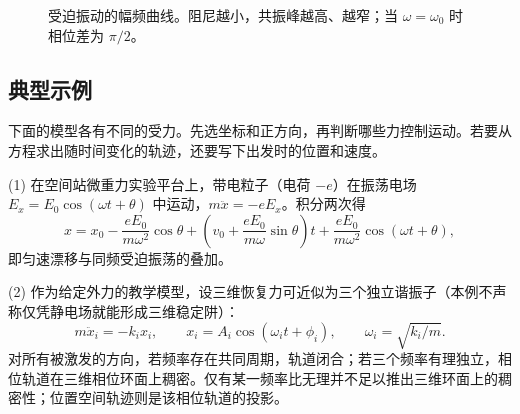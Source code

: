\begin{figure}[htbp]
\centering
{}
\caption{受迫振动的幅频曲线。阻尼越小，共振峰越高、越窄；当 $\omega=\omega_0$ 时相位差为 $\pi/2$。}
\label{fig:resonance}
\end{figure}

\subsection{典型示例}

下面的模型各有不同的受力。先选坐标和正方向，再判断哪些力控制运动。若要从方程求出随时间变化的轨迹，还要写下出发时的位置和速度。

\begin{example}[空间站微重力实验中的受迫振动与三维谐振子]
(1) 在空间站微重力实验平台上，带电粒子（电荷 $-e$）在振荡电场 $E_x=E_0\cos(\omega t+\theta)$ 中运动，$m\ddot x=-eE_x$。积分两次得
\[
x=x_0-\frac{eE_0}{m\omega^2}\cos\theta
+\left(v_0+\frac{eE_0}{m\omega}\sin\theta\right)t
+\frac{eE_0}{m\omega^2}\cos(\omega t+\theta),
\]
即匀速漂移与同频受迫振荡的叠加。

(2) 作为给定外力的教学模型，设三维恢复力可近似为三个独立谐振子（本例不声称仅凭静电场就能形成三维稳定阱）：
\[
m\ddot x_i=-k_i x_i,\qquad x_i=A_i\cos(\omega_i t+\phi_i),\qquad \omega_i=\sqrt{k_i/m}.
\]
对所有被激发的方向，若频率存在共同周期，轨道闭合；若三个频率有理独立，相位轨道在三维相位环面上稠密。仅有某一频率比无理并不足以推出三维环面上的稠密性；位置空间轨迹则是该相位轨道的投影。
\end{example}

